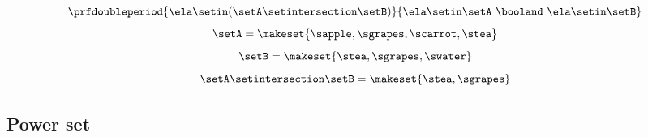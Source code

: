 \begin{forslides}
\begin{equation}\label{eq:slides_session2_12}
\prfdoubleperiod{ \ela \setin(\setA \setintersection \setB)}{\ela \setin\setA \ \booland\ \ela \setin\setB}
\end{equation}
 \begin{equation}\label{eq:slides_session2_13}
\setA = \makeset{ \sapple, \sgrapes, \scarrot, \stea }
\end{equation}
\begin{equation}\label{eq:slides_session2_14}
\setB = \makeset{ \stea, \sgrapes, \swater }
\end{equation}
 \begin{equation}\label{eq:slides_session2_15}
\setA \setintersection \setB = \makeset{ \stea, \sgrapes }
\end{equation}

\subsection{Power set}


\end{forslides}
